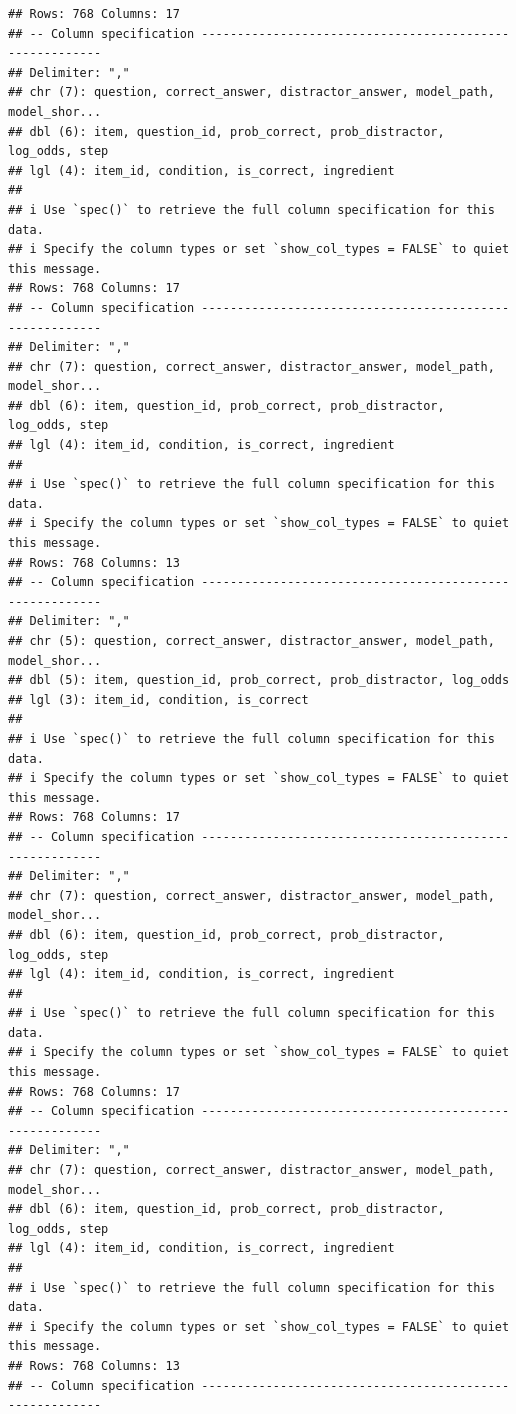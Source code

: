 \documentclass[
]{article}
\begin{document}
\begin{verbatim}
## Rows: 768 Columns: 17
## -- Column specification --------------------------------------------------------
## Delimiter: ","
## chr (7): question, correct_answer, distractor_answer, model_path, model_shor...
## dbl (6): item, question_id, prob_correct, prob_distractor, log_odds, step
## lgl (4): item_id, condition, is_correct, ingredient
## 
## i Use `spec()` to retrieve the full column specification for this data.
## i Specify the column types or set `show_col_types = FALSE` to quiet this message.
## Rows: 768 Columns: 17
## -- Column specification --------------------------------------------------------
## Delimiter: ","
## chr (7): question, correct_answer, distractor_answer, model_path, model_shor...
## dbl (6): item, question_id, prob_correct, prob_distractor, log_odds, step
## lgl (4): item_id, condition, is_correct, ingredient
## 
## i Use `spec()` to retrieve the full column specification for this data.
## i Specify the column types or set `show_col_types = FALSE` to quiet this message.
## Rows: 768 Columns: 13
## -- Column specification --------------------------------------------------------
## Delimiter: ","
## chr (5): question, correct_answer, distractor_answer, model_path, model_shor...
## dbl (5): item, question_id, prob_correct, prob_distractor, log_odds
## lgl (3): item_id, condition, is_correct
## 
## i Use `spec()` to retrieve the full column specification for this data.
## i Specify the column types or set `show_col_types = FALSE` to quiet this message.
## Rows: 768 Columns: 17
## -- Column specification --------------------------------------------------------
## Delimiter: ","
## chr (7): question, correct_answer, distractor_answer, model_path, model_shor...
## dbl (6): item, question_id, prob_correct, prob_distractor, log_odds, step
## lgl (4): item_id, condition, is_correct, ingredient
## 
## i Use `spec()` to retrieve the full column specification for this data.
## i Specify the column types or set `show_col_types = FALSE` to quiet this message.
## Rows: 768 Columns: 17
## -- Column specification --------------------------------------------------------
## Delimiter: ","
## chr (7): question, correct_answer, distractor_answer, model_path, model_shor...
## dbl (6): item, question_id, prob_correct, prob_distractor, log_odds, step
## lgl (4): item_id, condition, is_correct, ingredient
## 
## i Use `spec()` to retrieve the full column specification for this data.
## i Specify the column types or set `show_col_types = FALSE` to quiet this message.
## Rows: 768 Columns: 13
## -- Column specification --------------------------------------------------------

\end{verbatim}
\end{document}
